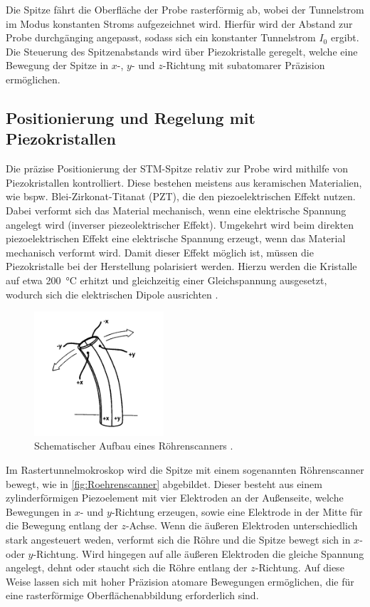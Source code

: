 Die Spitze fährt die Oberfläche der Probe rasterförmig ab, wobei der Tunnelstrom im Modus konstanten Stroms aufgezeichnet wird. 
Hierfür wird der Abstand zur Probe durchgänging angepasst, sodass sich ein konstanter Tunnelstrom $I_0$ ergibt. 
Die Steuerung des Spitzenabstands wird über Piezokristalle geregelt, welche eine Bewegung der Spitze in $x$-, $y$- und $z$-Richtung mit subatomarer Präzision ermöglichen. 

\subsection{Positionierung und Regelung mit Piezokristallen}
\label{sec:Piezokristalle}
Die präzise Positionierung der STM-Spitze relativ zur Probe wird mithilfe von Piezokristallen kontrolliert.
Diese bestehen meistens aus keramischen Materialien, wie bspw. Blei-Zirkonat-Titanat (PZT), die den piezoelektrischen Effekt nutzen. 
Dabei verformt sich das Material mechanisch, wenn eine elektrische Spannung angelegt wird (inverser piezeolektrischer Effekt). 
Umgekehrt wird beim direkten piezoelektrischen Effekt eine elektrische Spannung erzeugt, wenn das Material mechanisch verformt wird.
Damit dieser Effekt möglich ist, müssen die Piezokristalle bei der Herstellung polarisiert werden. 
Hierzu werden die Kristalle auf etwa \SI{200}{\celsius} erhitzt und gleichzeitig einer Gleichspannung ausgesetzt, wodurch sich die elektrischen Dipole ausrichten \cite{GuidesScanningProbeMicroscope}.\\
\begin{figure}
    \centering
    \includegraphics[width=0.43\textwidth]{Bilder/Roehrenscanner.png}
    \caption{Schematischer Aufbau eines Röhrenscanners \cite{GuidesScanningProbeMicroscope}.}
    \label{fig:Roehrenscanner}
\end{figure}
Im Rastertunnelmokroskop wird die Spitze mit einem sogenannten Röhrenscanner bewegt, wie in \autoref{fig:Roehrenscanner} abgebildet. 
Dieser besteht aus einem zylinderförmigen Piezoelement mit vier Elektroden an der Außenseite, welche Bewegungen in $x$- und $y$-Richtung erzeugen, sowie eine  Elektrode in der Mitte für die Bewegung entlang der $z$-Achse. 
Wenn die äußeren Elektroden unterschiedlich stark angesteuert weden, verformt sich die Röhre und die Spitze bewegt sich in $x$- oder $y$-Richtung.
Wird hingegen auf alle äußeren Elektroden die gleiche Spannung angelegt, dehnt oder staucht sich die Röhre entlang der $z$-Richtung.
Auf diese Weise lassen sich mit hoher Präzision atomare Bewegungen ermöglichen, die für eine rasterförmige Oberflächenabbildung erforderlich sind.
\FloatBarrier

